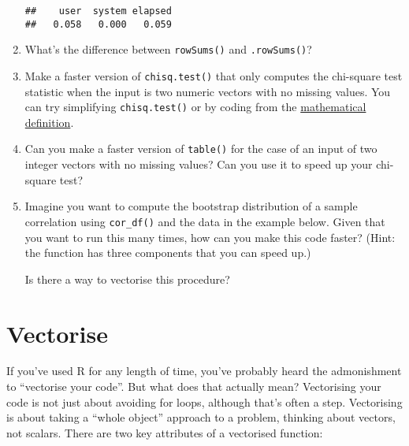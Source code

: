 \begin{enumerate}
\begin{verbatim}
##    user  system elapsed 
##   0.058   0.000   0.059
\end{verbatim}
\item
  What's the difference between \texttt{rowSums()} and
  \texttt{.rowSums()}?
\item
  Make a faster version of \texttt{chisq.test()} that only computes the
  chi-square test statistic when the input is two numeric vectors with
  no missing values. You can try simplifying \texttt{chisq.test()} or by
  coding from the
  \href{http://en.wikipedia.org/wiki/Pearson\%27s_chi-squared_test}{mathematical
  definition}.
\item
  Can you make a faster version of \texttt{table()} for the case of an
  input of two integer vectors with no missing values? Can you use it to
  speed up your chi-square test?
\item
  Imagine you want to compute the bootstrap distribution of a sample
  correlation using \texttt{cor\_df()} and the data in the example
  below. Given that you want to run this many times, how can you make
  this code faster? (Hint: the function has three components that you
  can speed up.)

\begin{Shaded}
\begin{Highlighting}[]
\StringTok{ }
\StringTok{ }\NormalTok{(}  

\StringTok{ }
\StringTok{ }\NormalTok{(} \NormalTok{)}
  \NormalTok{(df[i, , } \NormalTok{])[}\NormalTok{,}\NormalTok{]}
\NormalTok{\}}
\end{Highlighting}
\end{Shaded}

  Is there a way to vectorise this procedure?
\end{enumerate}

\hypertarget{vectorise}{%
\section{Vectorise}\label{vectorise}}

If you've used R for any length of time, you've probably heard the
admonishment to ``vectorise your code''. But what does that actually
mean? Vectorising your code is not just about avoiding for loops,
although that's often a step. Vectorising is about taking a ``whole
object'' approach to a problem, thinking about vectors, not scalars.
There are two key attributes of a vectorised function:

